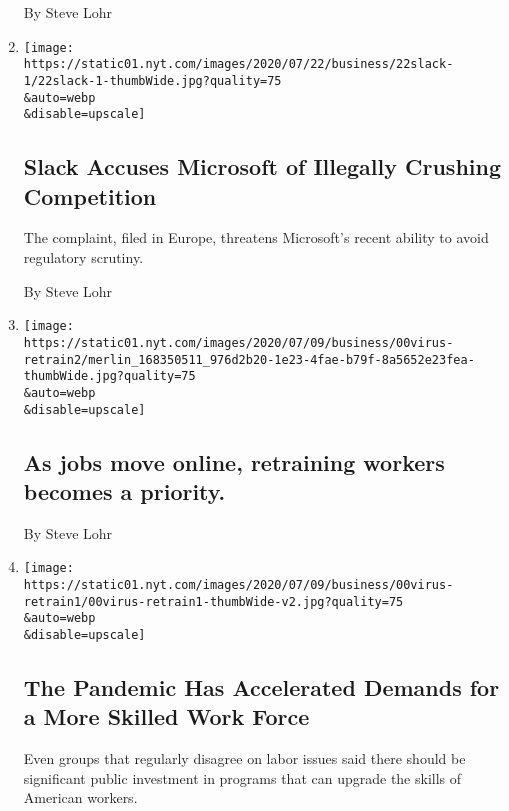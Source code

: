 \begin{enumerate}
  By Steve Lohr
\item
  \href{/2020/07/22/technology/slack-microsoft-antitrust.html}{}

  \texttt{[image: https://static01.nyt.com/images/2020/07/22/business/22slack-1/22slack-1-thumbWide.jpg?quality=75\\\&auto=webp\\\&disable=upscale]}

  \hypertarget{slack-accuses-microsoft-of-illegally-crushing-competition}{%
  \subsection{Slack Accuses Microsoft of Illegally Crushing
  Competition}\label{slack-accuses-microsoft-of-illegally-crushing-competition}}

  The complaint, filed in Europe, threatens Microsoft's recent ability
  to avoid regulatory scrutiny.

  By Steve Lohr
\item
  \href{/2020/07/13/business/as-jobs-move-online-retraining-workers-becomes-a-priority.html}{}

  \texttt{[image: https://static01.nyt.com/images/2020/07/09/business/00virus-retrain2/merlin\_168350511\_976d2b20-1e23-4fae-b79f-8a5652e23fea-thumbWide.jpg?quality=75\\\&auto=webp\\\&disable=upscale]}

  \hypertarget{as-jobs-move-online-retraining-workers-becomes-a-priority}{%
  \subsection{As jobs move online, retraining workers becomes a
  priority.}\label{as-jobs-move-online-retraining-workers-becomes-a-priority}}

  By Steve Lohr
\item
  \href{/2020/07/13/business/coronavirus-retraining-workers.html}{}

  \texttt{[image: https://static01.nyt.com/images/2020/07/09/business/00virus-retrain1/00virus-retrain1-thumbWide-v2.jpg?quality=75\\\&auto=webp\\\&disable=upscale]}

  \hypertarget{the-pandemic-has-accelerated-demands-for-a-more-skilled-work-force}{%
  \subsection{The Pandemic Has Accelerated Demands for a More Skilled
  Work
  Force}\label{the-pandemic-has-accelerated-demands-for-a-more-skilled-work-force}}

  Even groups that regularly disagree on labor issues said there should
  be significant public investment in programs that can upgrade the
  skills of American workers.


\end{enumerate}
